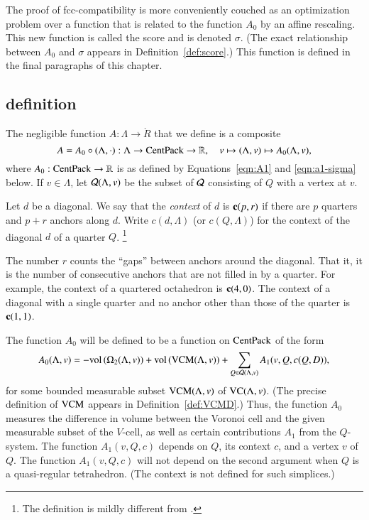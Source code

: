 The proof of fcc-compatibility is more conveniently couched as an
optimization problem over a function that is related to the
function $A_0$ by an affine rescaling.   This new function is
called the score and is denoted $\sigma$.  (The exact relationship
between $A_0$ and $\sigma$ appears in Definition~\ref{def:score}.)
This function is defined in the final paragraphs of this chapter.


\subsection{definition}
\label{sec:rules}


The
negligible function $A:\Lambda\to\ring{R}$ that we define is a
composite
  \begin{equation}
  A = A_0\circ (\Lambda,\cdot)
  :\Lambda\to {\operatorname{CentPack}}\to \mathbb{R},\quad v\mapsto (\Lambda,v)\mapsto
  A_0(\Lambda,v),
  \label{eqn:A}
  \end{equation}
where $A_0:{\operatorname{CentPack}}\to\mathbb{R}$ is as defined by
Equations~\ref{eqn:A1} and \ref{eqn:a1-sigma} below.  
If $v\in\Lambda$, let
${\mathcal Q}(\Lambda,v)$ be the subset of ${\mathcal Q}$ consisting of
$Q$ with a vertex at $v$.

\begin{definition} \label{def:context}
Let $d$ be a diagonal.  We say that the {\it
context\/} of $d$ is ${\operatorname{\bf c}}{(p,r)}$ if there are $p$ quarters and $p+r$ anchors
along $d$. Write $c(d,\Lambda)$ (or $c(Q,\Lambda)$) for the context of the diagonal $d$ of a quarter $Q$.%
\footnote{The definition is mildly different from \cite{DCG}.}
\end{definition}

\begin{remark}
The number $r$ counts the ``gaps'' between anchors around the
diagonal. That it, it is the number of consecutive anchors that
are not filled in by a quarter.  For example, the context of
a quartered octahedron is ${\operatorname{\bf c}}{(4,0)}$. The context of a diagonal with a
single quarter and no anchor other than those of the quarter is ${\operatorname{\bf c}}{(1,1)}$.
\end{remark}

The function $A_0$ will be defined to be a function on ${\operatorname{CentPack}}$
of the form
  \begin{equation}
  A_0(\Lambda,v) = -{\operatorname{vol}}\,(\Omega_2(\Lambda,v)) + {\operatorname{vol}}\,({\operatorname{VCM}}(\Lambda,v)) +
   \sum_{Q\in{\mathcal Q}(\Lambda,v)} A_1(v,Q,c(Q,D)),
   \label{eqn:A1}
   \end{equation}
for some bounded measurable subset ${\operatorname{VCM}}(\Lambda,v)$ of ${\operatorname{VC}}(\Lambda,v)$.   (The precise definition of ${\operatorname{VCM}}$ appears
in Definition~\ref{def:VCMD}.)
Thus, the function $A_0$ measures the difference in volume between
the Voronoi cell and the given measurable subset of the $V$-cell,
as well as certain contributions $A_1$ from the $Q$-system. The
function $A_1(v,Q,c)$ depends on $Q$, its context $c$, and a
vertex $v$ of $Q$.  The function $A_1(v,Q,c)$ will not depend on
the second argument when $Q$ is a quasi-regular tetrahedron.  (The
context is not defined for such simplices.)

